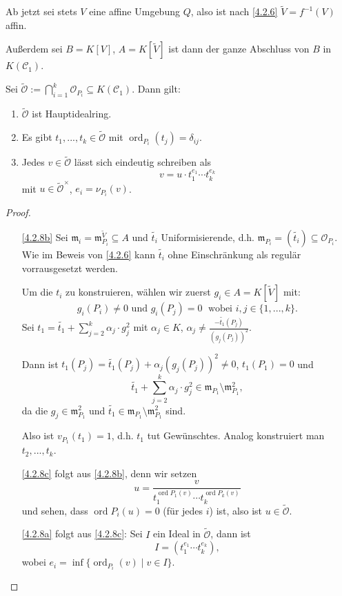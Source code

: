\documentclass[a4paper,12pt,index=toc]{scrbook}
\theoremstyle{keinenummern} %
\def\CC{\mathcal{C}}
\def\O{\mathcal{O}}
\def\m{\mathfrak{m}}
\newcommand{\ord}{\operatorname{ord}}
\renewcommand{\dotsc}{\ensuremath{\!...}}
\newcommand{\schlange}[1]{\widetilde{#1}}
\begin{document}
\begin{w} Ab jetzt sei stets $V$ eine affine Umgebung $Q$, also ist nach \cref{4.2.6} $\schlange{V}=f^{-1}(V)$ affin.

Außerdem sei $B=K[V]$, $A=K[\schlange{V}]$ ist dann der ganze Abschluss von $B$ in $K(\CC_1)$.
\end{w}

\begin{lem}\label{4.2.8} Sei $\schlange{\O}:=\displaystyle \bigcap_{i=1}^{k} \O_{P_i} \subseteq K(\CC_1)$. Dann gilt:
  \begin{enumerate}
  \item{} $\schlange{\O}$ ist Hauptidealring.
  \item{} Es gibt $t_1,\dotsc,t_k \in \schlange{\O}$ mit $\ord_{P_i} (t_j)=\delta_{ij}$.
  \item{} Jedes $v\in \schlange{\O}$ lässt sich eindeutig schreiben als \[v=u\cdot t_1^{e_1}\dotsm t_k^{e_k}\] mit $u\in \schlange{\O}^{\times}$, $e_i=\nu_{P_i} (v)$.
  \end{enumerate}
\end{lem}
\begin{proof} \begin{enumerate}
  \item[\ref{4.2.8b}] Sei $\m_i=\m_{P_i}^{\schlange{V}}\subseteq A$ und $\schlange{t_i}$ Uniformisierende, d.h. $\m_{P_i}=(\schlange{t_i})\subseteq \O_{P_i}$.
Wie im Beweis von \cref{4.2.6} kann $\schlange{t_i}$ ohne Einschränkung als regulär vorrausgesetzt werden.

Um die $t_i$ zu konstruieren, wählen wir zuerst $g_i\in A=K[\schlange{V}]$ mit: 
\[g_i(P_i)\neq 0 \text{ und } g_i(P_j)=0\; \text{ wobei }i,j\in \{1,\dotsc,k\}.\] 
Sei $t_1=\schlange{t_1}+\displaystyle \sum_{j=2}^{k} \alpha_j \cdot g_j^2$ mit $\alpha_j \in K$, $\displaystyle\alpha_j \neq \frac
{-\schlange{t_1}(P_j)}{(g_j(P_j))^2}$.

Dann ist $t_1(P_j)=\schlange{t_1}(P_j)+\alpha_j(g_j(P_j))^2\neq 0$, $t_1(P_1)=0$ und 
\[\schlange{t_1}+\displaystyle \sum_{j=2}^{k} \alpha_j \cdot g_j^2 \in \m_{P_1} \setminus \m_{P_1}^2,\]
 da die $g_j\in \m_{P_1}^2$ und $\schlange{t_1} \in \m_{P_1}\setminus \m_{P_1}^2$ sind. 

Also ist $v_{P_1}(t_1)=1$, d.h. $t_1$ tut Gewünschtes. Analog konstruiert man $t_2,\dotsc,t_k$.
  \item[\ref{4.2.8c}] folgt aus \ref{4.2.8b}, denn wir setzen 
  \[u=\frac{v}{t_1^{\ord P_1(v)}\dotsm t_k^{\ord P_k(v)}}\] und sehen, dass $\ord P_i(u)=0$ (für jedes $i$) ist, also ist $u\in \schlange{\O}$.
  \item[\ref{4.2.8a}] folgt aus \ref{4.2.8c}: Sei $I$ ein Ideal in $\schlange{\O}$, dann ist \[I=(t_1^{e_1}\dotsm t_k^{e_k}),\] wobei $e_i=\inf\{\ord_{P_i} (v) \mid v\in I\}$.
\end{enumerate}
\end{proof}
\end{document}
